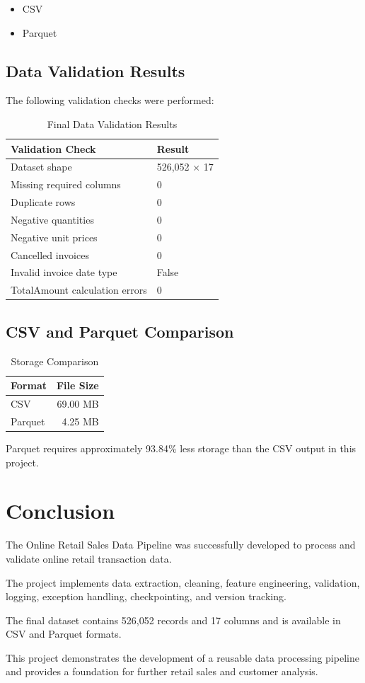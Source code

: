 \documentclass[12pt,a4paper]{report}
\begin{document}
\begin{itemize}
    \item CSV
    \item Parquet
\end{itemize}

\section{Data Validation Results}

The following validation checks were performed:

\begin{table}[H]
\centering
\begin{tabular}{ll}
\toprule
\textbf{Validation Check} & \textbf{Result}\\
\midrule
Dataset shape & 526,052 $\times$ 17\\
Missing required columns & 0\\
Duplicate rows & 0\\
Negative quantities & 0\\
Negative unit prices & 0\\
Cancelled invoices & 0\\
Invalid invoice date type & False\\
TotalAmount calculation errors & 0\\
\bottomrule
\end{tabular}
\caption{Final Data Validation Results}
\end{table}

\section{CSV and Parquet Comparison}

\begin{table}[H]
\centering
\begin{tabular}{lr}
\toprule
\textbf{Format} & \textbf{File Size}\\
\midrule
CSV & 69.00 MB\\
Parquet & 4.25 MB\\
\bottomrule
\end{tabular}
\caption{Storage Comparison}
\end{table}

Parquet requires approximately 93.84\% less storage
than the CSV output in this project.

\chapter{Conclusion}

The Online Retail Sales Data Pipeline was successfully
developed to process and validate online retail
transaction data.

The project implements data extraction, cleaning,
feature engineering, validation, logging,
exception handling, checkpointing, and version tracking.

The final dataset contains 526,052 records and
17 columns and is available in CSV and Parquet formats.

This project demonstrates the development of a
reusable data processing pipeline and provides
a foundation for further retail sales and
customer analysis.
\end{document}
